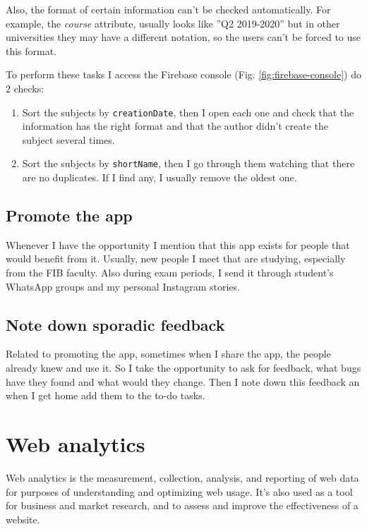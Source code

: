 Also, the format of certain information can't be checked automatically. For example, the \textit{course} attribute, usually looks like ''Q2 2019-2020'' but in other universities they may have a different notation, so the users can't be forced to use this format.

To perform these tasks I access the Firebase console (Fig. \ref{fig:firebase-console}) do 2 checks: 
\begin{enumerate}
    \item Sort the subjects by \texttt{creationDate}, then I open each one and check that the information has the right format and that the author didn't create the subject several times.
    \item Sort the subjects by \texttt{shortName}, then I go through them watching that there are no duplicates. If I find any, I usually remove the oldest one.
\end{enumerate}

\subsection{Promote the app}

Whenever I have the opportunity I mention that this app exists for people that would benefit from it. Usually, new people I meet that are studying, especially from the FIB faculty. Also during exam periods, I send it through student's WhatsApp groups and my personal Instagram stories.

\subsection{Note down sporadic feedback}

Related to promoting the app, sometimes when I share the app, the people already knew and use it. So I take the opportunity to ask for feedback, what bugs have they found and what would they change. Then I note down this feedback an when I get home add them to the to-do tasks.


\section{Web analytics}
\label{sec:performance}

Web analytics is the measurement, collection, analysis, and reporting of web data for purposes of understanding and optimizing web usage. It's also used as a tool for business and market research, and to assess and improve the effectiveness of a website. 

